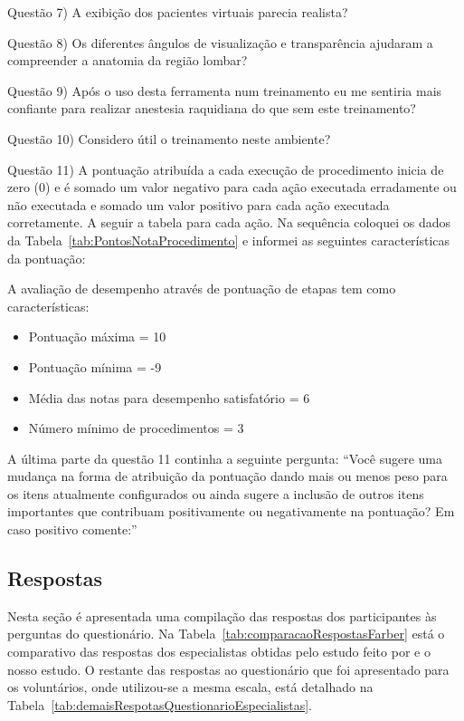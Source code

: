 Questão 7) A exibição dos pacientes virtuais parecia realista?

Questão 8) Os diferentes ângulos de visualização e transparência ajudaram a compreender a anatomia da região lombar?

Questão 9) Após o uso desta ferramenta num treinamento eu me sentiria mais confiante para realizar anestesia raquidiana do que sem este treinamento?

Questão 10) Considero útil o treinamento neste ambiente?

Questão 11) A pontuação atribuída a cada execução de procedimento inicia de zero (0) e é somado um valor negativo para cada ação executada erradamente ou não executada e somado um valor positivo para cada ação executada corretamente. A seguir a tabela para cada ação. Na sequência coloquei os dados da Tabela~\ref{tab:PontosNotaProcedimento} e informei as seguintes características da pontuação:

A avaliação de desempenho através de pontuação de etapas tem como características:
\begin{itemize}
   \item Pontuação máxima = 10
   \item Pontuação mínima = -9
   \item Média das notas para desempenho satisfatório = 6
   \item Número mínimo de procedimentos = 3
 \end{itemize}

A última parte da questão 11 continha a seguinte pergunta:
``Você sugere uma mudança na forma de atribuição da pontuação dando mais ou menos peso para os itens atualmente configurados ou ainda sugere a inclusão de outros itens importantes que contribuam positivamente ou negativamente na pontuação? Em caso positivo comente:''

\subsection{Respostas}
\label{sec:respostasEspecialistas}

Nesta seção é apresentada uma compilação das respostas dos participantes às perguntas do questionário. Na Tabela~\ref{tab:comparacaoRespostasFarber} está o comparativo das respostas dos especialistas obtidas pelo estudo feito por \textcite{Farber2009} e o nosso estudo. O restante das respostas ao questionário que foi apresentado para os voluntários, onde utilizou-se a mesma escala, está detalhado na Tabela~\ref{tab:demaisRespotasQuestionarioEspecialistas}.

